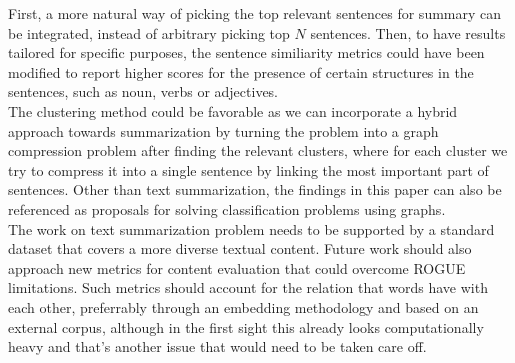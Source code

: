 \documentclass[9pt,twocolumn,twoside]{pnas-report}
\begin{document}
First, a more natural way of picking the top relevant sentences for summary can be integrated, instead of arbitrary picking top $N$ sentences.
Then, to have results tailored for specific purposes, the sentence similiarity metrics could have been modified to report higher scores for the presence of certain structures in the sentences, such as noun, verbs or adjectives.  \\ 
The clustering method could be favorable as we can incorporate a hybrid approach towards summarization by turning the problem into a graph compression problem after finding the relevant clusters, where for each cluster we try to compress it into a single sentence by linking the most important part of sentences. 
Other than text summarization, the findings in this paper can also be referenced as proposals for solving classification problems using graphs. \\
The work on text summarization problem needs to be supported by a standard dataset that covers a more diverse textual content. Future work should also approach new metrics for content evaluation that could overcome ROGUE limitations. Such metrics should account for the relation that words have with each other, preferrably through an embedding methodology and based on an external corpus, although in the first sight this already looks computationally heavy and that's another issue that would need to be taken care off.
\end{document}
